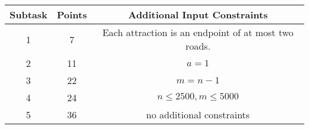 \begin{center}
\renewcommand{\arraystretch}{1.5}
\begin{tabular}{|c|c|c|}
\hline
Subtask & Points & Additional Input Constraints\\
\hline
1 & 7 & Each attraction is an endpoint of at most two roads. \\
\hline
2 & 11 & $a = 1$ \\
\hline
3 & 22 & $m = n-1$ \\
\hline
4 & 24 & $n \leq 2500, m \leq 5000$ \\
\hline
5 & 36 & no additional constraints \\
\hline
\end{tabular}
\end{center}